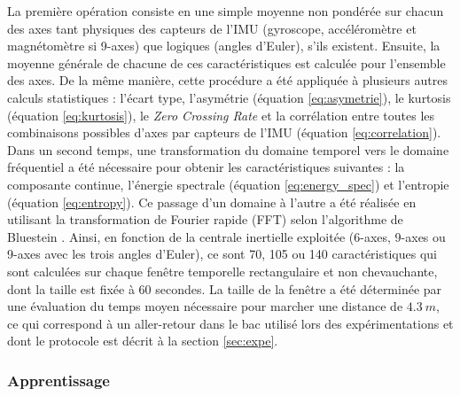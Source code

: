 La première opération consiste en une simple moyenne non pondérée sur chacun des axes tant \og{}physiques\fg{} des capteurs de l'\acs{IMU} (gyroscope, accéléromètre et magnétomètre si 9-axes) que \og{}logiques\fg{} (angles d'Euler), s'ils existent. Ensuite, la moyenne générale de chacune de ces caractéristiques est calculée pour l'ensemble des axes. De la même manière, cette procédure a été appliquée à plusieurs autres calculs statistiques : l'écart type, l'asymétrie (équation \ref{eq:asymetrie}), le kurtosis (équation \ref{eq:kurtosis}), le \textit{Zero Crossing Rate} et la corrélation entre toutes les combinaisons possibles d'axes par capteurs de l'\acs{IMU} (équation \ref{eq:correlation}). Dans un second temps, une transformation du domaine temporel vers le domaine fréquentiel a été nécessaire pour obtenir les caractéristiques suivantes : la composante continue, l'énergie spectrale (équation \ref{eq:energy_spec}) et l'entropie  (équation \ref{eq:entropy}). Ce passage d'un domaine à l'autre a été réalisée en utilisant la transformation de Fourier rapide (\acs{FFT}) selon l'algorithme de Bluestein \citep{Bluestein1970}. Ainsi, en fonction de la centrale inertielle exploitée (6-axes, 9-axes ou 9-axes avec les trois angles d'Euler), ce sont 70, 105 ou 140 caractéristiques qui sont calculées sur chaque fenêtre temporelle rectangulaire et non chevauchante, dont la taille est fixée à 60 secondes. La taille de la fenêtre a été déterminée par une évaluation du temps moyen nécessaire pour marcher une distance de $4.3\: m$, ce qui correspond à un aller-retour dans le bac utilisé lors des expérimentations et dont le protocole est décrit à la section \ref{sec:expe}.

\subsubsection{Apprentissage}

